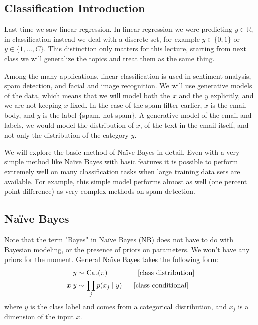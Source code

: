 \documentclass{article}
\renewcommand{\v}{\boldsymbol}
\begin{document}

\subsection{Classification Introduction}
Last time we saw linear regression. In linear regression we were predicting $y \in \mathbb{R}$, in classification instead we deal with a discrete set, for example $y \in \{ 0,1\}$ or $y\in \{1, \ldots, C\}$. This distinction only matters for this lecture, starting from next class we will generalize the topics and treat them as the same thing.

\smallskip

Among the many applications, linear classification is used in sentiment analysis, spam detection, and facial and image recognition. We will use generative models of the data, which means that we will model both the $x$ and the $y$ explicitly, and we are not keeping $x$ fixed. In the case of the spam filter earlier, $x$ is the email body, and $y$ is the label $\{$spam, not spam$\}$. A generative model of the email and labels, we would model the distribution of $x$, of the text in the email itself, and not only the distribution of the category $y$.

\smallskip

We will explore the basic method of Na\"ive Bayes in detail. Even with a very simple method like Na\"ive Bayes with basic features it is possible to perform extremely well on many classification tasks when large training data sets are available. For example, this simple model performs almost as well (one percent point difference) as very complex methods on spam detection.

\subsection{Na\"ive Bayes}
Note that the term "Bayes" in Na\"ive Bayes (NB) does not have to do with Bayesian modeling, or the presence of priors on parameters. We won't have any priors for the moment.  General Na\"ive Bayes takes the following form:
\begin{align*}
    y &\sim \on{Cat}(\pi) ~~~~~~~~~~~~~ \text{[class distribution]}\\
    \v x|y &\sim \prod_{j}p(x_j \mid y) ~~~~~ \text{[class conditional]}
\end{align*}
where $y$ is the class label and comes from a categorical distribution, and $x_j$ is a dimension of the input $x$.
\end{document}
